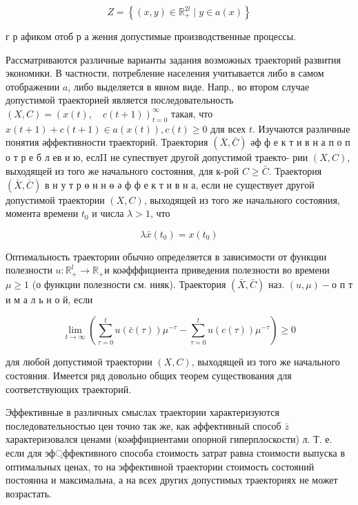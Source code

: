\documentclass[10pt]{article}
\begin{document}
\[

Z=\left\{(x, y) \in \mathbb{R}_{+}^{2 l} \mid y \in a(x)\right\}

\]



г р афиком отоб р а жения допустимые производственные процессы.



Рассматриваются различные варианты задания возможных траекторий развития экономики. В частности, потребление населения учитывается либо в самом отображении $a$, либо выделяется в явном виде. Напр., во втором случае допустимой траекторией является последовательность $(X, C)=(x(t), \quad c(t+1))_{t=0}^{\infty}$ такая, что $x(t+1)+c(t+1) \in a(x(t)), c(t) \geqslant 0$ для всех $t$. Изучаются различные понятия әффективности траекторий. Траектория $(\bar{X}, \bar{C})$ әф ф е к т и в н а п о п о т р е б л ев и ю, еслII не супествует другой допустимой траекто- рии $(X, C)$, выходящей из того же начального состояния, для к-рой $C \geqslant \bar{C}$. Траектория $(\bar{X}, \bar{C})$ в н у т р ө н н ө ә ф ф е к т и в н а, если не существует другой допустимой траектории $(X, C)$, выходящей из того же начального состояния, момента времени $t_{0}$ и числа $\lambda>1$, что



\[

\lambda \bar{x}\left(t_{0}\right)=x\left(t_{0}\right)

\]



Оптимальность траектории обычно определяется в зависимости от функции полезности $u: \mathbb{R}_{+}^{l} \rightarrow \mathbb{R}_{+}$и коәфффициента приведения полезности во времени $\mu \geqslant 1$ (о функции полезности см. нияк). Траектория $(\bar{X}, \bar{C})$ наз. $(u, \mu)-о$ п т и м а л ь н о й, если



\[

\lim _{t \rightarrow \infty}\left(\sum_{\tau=0}^{t} u(\bar{c}(\tau)) \mu^{-\tau}-\sum_{\tau=0}^{t} u(c(\tau)) \mu^{-\tau}\right) \geqslant 0

\]



для любой допустимой траектории $(X, C)$, выходящей из того же начального состояния. Имеется ряд довольно общих теорем существования для соответствующих траекторий.



Эффективные в различных смыслах траектории характеризуются последовательностью цен точно так же, как әффективный способ $\bar{z}$ характеризовался ценами (коәффициентами опорной гиперплоскости) л. Т. е. если для эф্ффективного способа стоимость затрат равна стоимости выпуска в оптимальных ценах, то на эффективной траектории стоимость состояний постоянна и максимальна, а на всех других допустимых траекториях не может возрастать.
\end{document}
